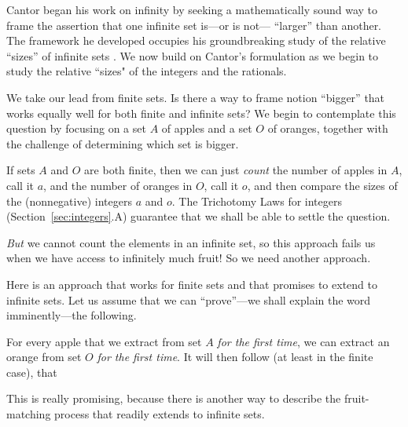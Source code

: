 \medskip

Cantor began his work on infinity by seeking a mathematically sound way to frame the assertion that one infinite set is---or is not--- ``larger'' than another.  The framework he developed occupies his groundbreaking study of the relative ``sizes'' of infinite sets \cite{Cantor74,Cantor78}.  We now build on Cantor's formulation as we begin to study the relative ``sizes" of the integers and the rationals.

\medskip

We take our lead from finite sets.  Is there a way to frame notion ``bigger'' that works equally well for both finite and infinite sets?  We begin to contemplate this question by focusing on a set $A$ of apples and a set $O$ of oranges, together with the challenge of determining which set is bigger.

\medskip

If sets $A$ and $O$ are both finite, then we can just {\em count} the number of apples in $A$, call it $a$, and the number of oranges in $O$, call it $o$, and then compare the sizes of the (nonnegative) integers $a$ and $o$.  The Trichotomy Laws for integers (Section~\ref{sec:integers}.A) guarantee that we shall be able to settle the question.

\smallskip

\noindent
{\em But} we cannot count the elements in an infinite set, so this approach fails us when we have access to infinitely much fruit!  So we need another approach.

\medskip

Here is an approach that works for finite sets and that promises to extend to infinite sets.  Let us assume that we can ``prove''---we shall explain the word imminently---the following.

\smallskip

For every apple that we extract from set $A$ {\em for the first time}, we can extract an orange from set $O$ {\em for the first time}.  It will then follow (at least in the finite case), that \\
\hspace*{.35in}{\em There are at least as many oranges as apples!}

\medskip

\noindent
This is really promising, because there is another way to describe the fruit-matching process that readily extends to infinite sets. \\

